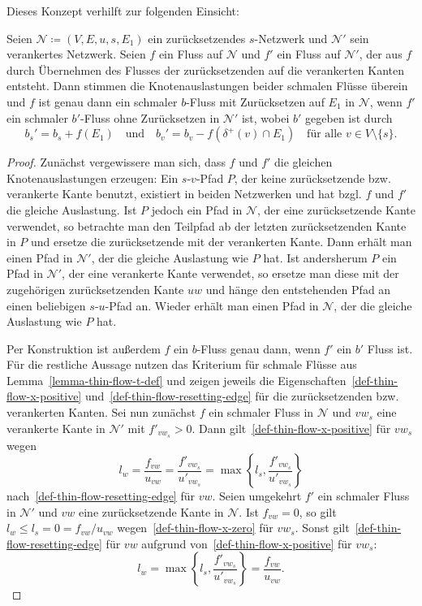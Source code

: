 Dieses Konzept verhilft zur folgenden Einsicht:
\begin{lemma}\label{lemma-thin-flows-anchored-networks}
	Seien $\mathcal{N}\coloneq (V, E, u, s, E_1)$ ein zurücksetzendes $s$-Netzwerk und $\mathcal{N}'$ sein verankertes Netzwerk.
	Seien $f$ ein Fluss auf $\mathcal{N}$ und $f'$ ein Fluss auf $\mathcal{N}'$, der aus $f$ durch Übernehmen des Flusses der zurücksetzenden auf die verankerten Kanten entsteht.
	Dann stimmen die Knotenauslastungen beider schmalen Flüsse überein und
	$f$ ist genau dann ein schmaler $b$-Fluss mit Zurücksetzen auf $E_1$ in $\mathcal{N}$, wenn $f'$ ein schmaler $b'$-Fluss ohne Zurücksetzen in $\mathcal{N}'$ ist, wobei $b'$ gegeben ist durch
	\[
		b_s' = b_s + f(E_1) \text{~~ und ~~} b_v' = b_v - f(\delta^+(v)\cap E_1) \text{~~ für alle $v\in V\setminus \{s \}$}.
	\]
\end{lemma}
\begin{proof}
	Zunächst vergewissere man sich, dass $f$ und $f'$ die gleichen Knotenauslastungen erzeugen:
	Ein $s$-$v$-Pfad $P$, der keine zurücksetzende bzw. verankerte Kante benutzt, existiert in beiden Netzwerken und hat bzgl. $f$ und $f'$ die gleiche Auslastung.
	Ist $P$ jedoch ein Pfad in $\mathcal{N}$, der eine zurücksetzende Kante verwendet, so betrachte man den Teilpfad ab der letzten zurücksetzenden Kante in $P$ und ersetze die zurücksetzende mit der verankerten Kante.
	Dann erhält man einen Pfad in $\mathcal{N}'$, der die gleiche Auslastung wie $P$ hat.
	Ist andersherum $P$ ein Pfad in $\mathcal{N}'$, der eine verankerte Kante verwendet, so ersetze man diese mit der zugehörigen zurücksetzenden Kante $uw$ und hänge den entstehenden Pfad an einen beliebigen $s$-$u$-Pfad an.
	Wieder erhält man einen Pfad in $\mathcal{N}$, der die gleiche Auslastung wie $P$ hat.
	
	Per Konstruktion ist außerdem $f$ ein $b$-Fluss genau dann, wenn $f'$ ein $b'$ Fluss ist.
	Für die restliche Aussage nutzen das Kriterium für schmale Flüsse aus Lemma~\ref{lemma-thin-flow-t-def} und zeigen jeweils die Eigenschaften~\ref{def-thin-flow-x-positive} und~\ref{def-thin-flow-resetting-edge} für die zurücksetzenden bzw. verankerten Kanten.
	Sei nun zunächst $f$ ein schmaler Fluss in $\mathcal{N}$ und $vw_s$ eine verankerte Kante in $\mathcal{N'}$ mit $f'_{vw_s} > 0$.
	Dann gilt~\ref{def-thin-flow-x-positive} für $vw_s$ wegen
	\[ l_w = \frac{f_{vw}}{u_{vw}} = \frac{f'_{vw_s}}{u'_{vw_s}} = \max\left\{ l_s, \frac{f'_{vw_s}}{u'_{vw_s}} \right\} \]
	nach~\ref{def-thin-flow-resetting-edge} für $vw$.
	Seien umgekehrt $f'$ ein schmaler Fluss in $\mathcal{N}'$ und $vw$ eine zurück\-setzende Kante in $\mathcal{N}$.
	Ist $f_{vw} = 0$, so gilt $l_w \leq l_s = 0 = f_{vw}/u_{vw}$ wegen~\ref{def-thin-flow-x-zero} für $vw_s$.
	Sonst gilt~\ref{def-thin-flow-resetting-edge} für $vw$ aufgrund von~\ref{def-thin-flow-x-positive} für $vw_s$:
	\[
		l_w = \max\left\{ l_s, \frac{f'_{vw_s}}{u'_{vw_s}} \right\} = \frac{f_{vw}}{u_{vw}}.
	\]
\end{proof}

